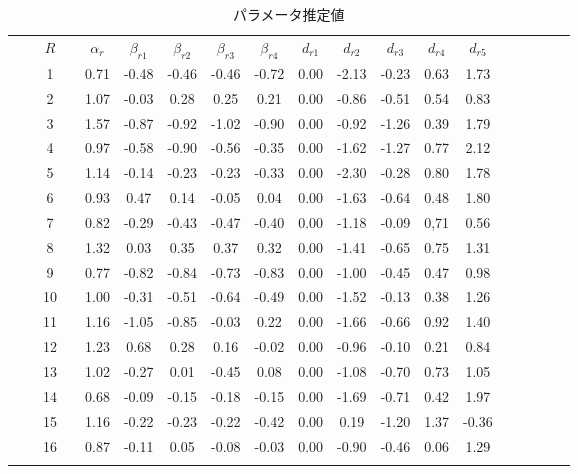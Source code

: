 \documentclass[a4paper,11pt,oneside,openany]{jsbook}
\newcommand{\bhline}[1]{\noalign{\hrule height #1}}
\begin{document}
\begin{table}[h!]
\begin{center}
\caption{パラメータ推定値}
\setlength{\tabcolsep}{5.pt}
\begin{tabular}{ccccccccccccccccccc}  
\bhline{1pt}
& & $R$ & & $\alpha_r$ & $\beta_{r1}$ & $\beta_{r2}$ & $\beta_{r3}$ &$\beta_{r4}$ & $d_{r1}$ &  $d_{r2}$ & $d_{r3}$ & $d_{r4}$ & $d_{r5}$  \\
\bhline{1pt}
 &  & 1  &  & 0.71 & -0.48  & -0.46 & -0.46 &-0.72 & 0.00  & -2.13 & -0.23 & 0.63 & 1.73\\
 &  & 2  &  & 1.07 & -0.03  & 0.28  & 0.25  & 0.21 & 0.00  & -0.86 & -0.51 & 0.54 & 0.83 \\
 &  & 3  &  & 1.57 & -0.87  & -0.92  & -1.02  & -0.90 & 0.00 & -0.92 & -1.26  & 0.39 & 1.79 \\
 &  & 4  &  & 0.97 & -0.58  & -0.90  & -0.56 & -0.35 & 0.00 & -1.62 & -1.27  & 0.77 & 2.12 \\
 &  & 5  &  & 1.14 & -0.14 & -0.23 & -0.23 & -0.33 & 0.00 & -2.30 & -0.28  & 0.80 & 1.78\\
 &  & 6  &  & 0.93 & 0.47 & 0.14 & -0.05 & 0.04 & 0.00 & -1.63 & -0.64  & 0.48 & 1.80\\
 &  & 7  &  & 0.82 & -0.29  & -0.43 & -0.47 & -0.40 & 0.00 & -1.18 & -0.09  & 0,71 & 0.56 \\
 &  & 8  &  & 1.32 & 0.03 & 0.35 & 0.37 & 0.32 & 0.00 & -1.41 & -0.65  & 0.75 & 1.31 \\
 &  & 9  &  & 0.77 & -0.82 & -0.84 & -0.73 & -0.83 & 0.00 & -1.00 & -0.45 & 0.47 & 0.98 \\
 &  & 10 &  & 1.00 & -0.31 & -0.51 & -0.64 & -0.49 & 0.00 & -1.52 & -0.13 & 0.38 & 1.26 \\
 &  & 11 &  & 1.16 & -1.05 & -0.85 & -0.03 & 0.22 & 0.00 & -1.66 & -0.66 & 0.92 & 1.40 \\
 &  & 12 &  & 1.23 & 0.68 & 0.28 & 0.16 & -0.02 & 0.00 & -0.96 & -0.10 & 0.21 & 0.84 \\
 &  & 13 &  & 1.02 & -0.27 & 0.01 & -0.45 & 0.08 & 0.00 & -1.08 & -0.70 & 0.73 & 1.05\\
 &  & 14 &  & 0.68 & -0.09  & -0.15 & -0.18 & -0.15 & 0.00 & -1.69 & -0.71 & 0.42 & 1.97 \\
 &  & 15 &  & 1.16 & -0.22 & -0.23 & -0.22 & -0.42 & 0.00 & 0.19 & -1.20  & 1.37 & -0.36 \\
 &  & 16 &  & 0.87 & -0.11 & 0.05 & -0.08 & -0.03 & 0.00 & -0.90 & -0.46 & 0.06 & 1.29 \\
\bhline{1pt}
\end{tabular}
\label{param}
\end{center}
\end{table}
\end{document}
